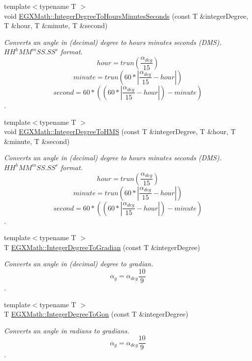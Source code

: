 \begin{DoxyCompactItemize}
{\footnotesize template$<$typename T $>$ }\\void \mbox{\hyperlink{group___e_g_x_math-_angle_conversions-_integer_degree_gaaac96728b305fd8ed024843f4e92fd08}{E\+G\+X\+Math\+::\+Integer\+Degree\+To\+Hours\+Minutes\+Seconds}} (const T \&integer\+Degree, T \&hour, T \&minute, T \&second)
\begin{DoxyCompactList}\small\item\em Converts an angle in (decimal) degree to hours minutes seconds (D\+MS). ${HH}^{h}{MM}^{m}{SS.SS}^{s}$ format. \[hour=trun(\frac{\alpha_{deg}}{15})\] \[minute=trun(60 * |\frac{\alpha_{deg}}{15} - hour|)\] \[second=60 * ((60 * |\frac{\alpha_{deg}}{15} - hour|)-minute)\]. \end{DoxyCompactList}\item 
{\footnotesize template$<$typename T $>$ }\\void \mbox{\hyperlink{group___e_g_x_math-_angle_conversions-_integer_degree_gae6b79bd5a92f8c6942b9fc2c50695e6a}{E\+G\+X\+Math\+::\+Integer\+Degree\+To\+H\+MS}} (const T \&integer\+Degree, T \&hour, T \&minute, T \&second)
\begin{DoxyCompactList}\small\item\em Converts an angle in (decimal) degree to hours minutes seconds (D\+MS). ${HH}^{h}{MM}^{m}{SS.SS}^{s}$ format. \[hour=trun(\frac{\alpha_{deg}}{15})\] \[minute=trun(60 * |\frac{\alpha_{deg}}{15} - hour|)\] \[second=60 * ((60 * |\frac{\alpha_{deg}}{15} - hour|)-minute)\]. \end{DoxyCompactList}\item 
{\footnotesize template$<$typename T $>$ }\\T \mbox{\hyperlink{group___e_g_x_math-_angle_conversions-_integer_degree_ga47127467ff7a8ef57f6be9ce496a97df}{E\+G\+X\+Math\+::\+Integer\+Degree\+To\+Gradian}} (const T \&integer\+Degree)
\begin{DoxyCompactList}\small\item\em Converts an angle in (decimal) degree to gradian. \[\alpha_{g}=\alpha_{deg}\frac{10}{9}\]. \end{DoxyCompactList}\item 
{\footnotesize template$<$typename T $>$ }\\T \mbox{\hyperlink{group___e_g_x_math-_angle_conversions-_integer_degree_ga6e5be425c37ad27319f09329156c64bb}{E\+G\+X\+Math\+::\+Integer\+Degree\+To\+Gon}} (const T \&integer\+Degree)
\begin{DoxyCompactList}\small\item\em Converts an angle in radians to gradians. \[\alpha_{g}=\alpha_{deg}\frac{10}{9}\]. \end{DoxyCompactList}\item 

\end{DoxyCompactItemize}
